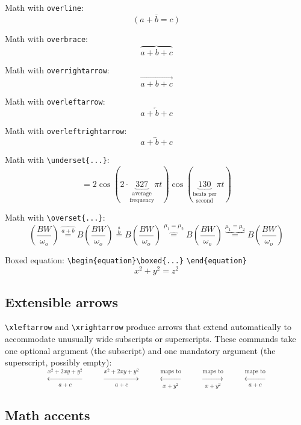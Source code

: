 \documentclass[numbers,webpdf,imaiai]{ima-authoring-template}%
\theoremstyle{thmstyleone}%
\theoremstyle{thmstyletwo}%
\theoremstyle{thmstylethree}%
\numberwithin{equation}{section}
\begin{document}
Math with \verb+overline+:
\[\overline{(a+b=c)}\]

Math with \verb+overbrace+:
\[\overbrace{a+b+c}\]

Math with \verb+overrightarrow+:
\[\overrightarrow{a+b+c} \]

Math with \verb+overleftarrow+:
\[\overleftarrow{a + b + c}\]

Math with \verb+overleftrightarrow+:
\[\overleftrightarrow{a + b + c}\]

Math with \verb+\underset{...}+:
\[ = 2\cos (2\cdot \underset{\mbox{frequency}}{\underset{\mbox{average}}{\underbrace{327}}} \pi t) \cos
(\underset{\mbox{second}}{\underset{\mbox{beats per}}{\underbrace{130}}} \pi t)\]

Math with \verb+\overset{...}+:
\begin{equation*}
\left(\frac{BW}{\omega_o}\right)
\overset{\overbrace{a+b}}{=} B
\left(\frac{BW}{\omega_o}\right)
\overset{\overset{a}{b}}{=} B
\left(\frac{BW}{\omega_o}\right)
\overset{\mu_1=\mu_2}{\overbrace{=}} B
\left(\frac{BW}{\omega_o}\right)
\overset{\underbrace{\mu_1=\mu_2}}{=} B
\left(\frac{BW}{\omega_o}\right)
\end{equation*}

Boxed equation: \verb+\begin{equation}\boxed{...}+ \verb+\end{equation}+
\begin{equation}
 \boxed{x^2+y^2 = z^2}
\end{equation}

\subsection{Extensible arrows}

\verb+\xleftarrow+ and \verb+\xrightarrow+ produce arrows that extend automatically to
accommodate unusually wide subscripts or superscripts. These commands take
one optional argument (the subscript) and one mandatory argument (the superscript, possibly empty):
\[
\xleftarrow[a+c]{x^2+2xy+y^2} \qquad
\xrightarrow[a+c]{x^2+2xy+y^2}\qquad
\xleftarrow[x+y^2]{\text{maps to}}\qquad
\xrightarrow[x+y^2]{\text{maps to}}\qquad
\xleftarrow[a+c]{\text{maps to}}
\]

\subsection{Math accents}
\end{document}
